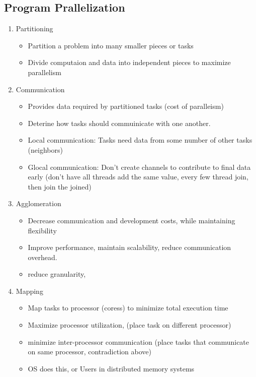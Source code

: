 \documentclass{article}
\begin{document}
\subsection{Program Prallelization}
\begin{enumerate}
    \item Partitioning
          \begin{itemize}
              \item Partition a problem into many smaller pieces or tasks
              \item Divide computaion and data into independent pieces to maximize parallelism
          \end{itemize}
    \item Communication
          \begin{itemize}
              \item Provides data required by partitioned tasks (cost of paralleism)
              \item Deterine how tasks should commuinicate with one another.
              \item Local communication: Tasks need data from some number of other tasks (neighbors)
              \item Glocal communication: Don't create channels to contribute to final data early (don't have all threads add the same value, every few thread join, then join the joined)
          \end{itemize}
    \item Agglomeration
          \begin{itemize}
              \item Decrease communication and development costs, while maintaining flexibility
              \item Improve performance, maintain scalability, reduce communication overhead.
              \item reduce granularity,
          \end{itemize}
    \item Mapping
          \begin{itemize}
              \item Map tasks to processor (coress) to minimize total execution time
              \item Maximize processor utilization, (place task on different processor)
              \item minimize inter-processor communication (place tasks that communicate on same processor, contradiction above)
              \item OS does this, or Users in distributed memory systems
          \end{itemize}
\end{enumerate}
\end{document}
